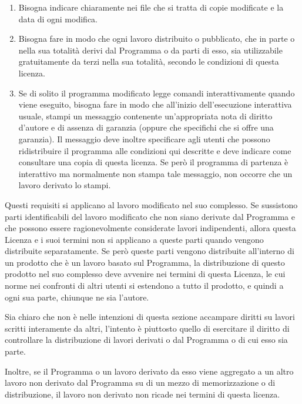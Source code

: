 \begin{enumerate}
  \begin{enumerate}
  \item Bisogna indicare chiaramente nei file che si tratta
    di copie modificate e la data di ogni modifica.

  \item Bisogna fare in modo che ogni lavoro distribuito o
    pubblicato, che in parte o nella sua totalit\`a derivi
    dal Programma o da parti di esso, sia utilizzabile
    gratuitamente da terzi nella sua totalit\`a, secondo le
    condizioni di questa licenza.

  \item Se di solito il programma modificato legge comandi
    interattivamente quando viene eseguito, bisogna fare in
    modo che all'inizio dell'esecuzione interattiva usuale,
    stampi un messaggio contenente un'appropriata nota di
    diritto d'autore e di assenza di garanzia (oppure che
    specifichi che si offre una garanzia). Il messaggio deve
    inoltre specificare agli utenti che possono
    ridistribuire il programma alle condizioni qui descritte
    e deve indicare come consultare una copia di questa
    licenza. Se per\`o il programma di partenza \`e
    interattivo ma normalmente non stampa tale messaggio,
    non occorre che un lavoro derivato lo stampi.
  \end{enumerate}

  Questi requisiti si applicano al lavoro modificato nel suo
  complesso. Se sussistono parti identificabili del lavoro
  modificato che non siano derivate dal Programma e che
  possono essere ragionevolmente considerate lavori
  indipendenti, allora questa Licenza e i suoi termini non
  si applicano a queste parti quando vengono distribuite
  separatamente. Se per\`o queste parti vengono distribuite
  all'interno di un prodotto che \`e un lavoro basato sul
  Programma, la distribuzione di questo prodotto nel suo
  complesso deve avvenire nei termini di questa Licenza, le
  cui norme nei confronti di altri utenti si estendono a
  tutto il prodotto, e quindi a ogni sua parte, chiunque ne
  sia l'autore.

  Sia chiaro che non \`e nelle intenzioni di questa sezione
  accampare diritti su lavori scritti interamente da altri,
  l'intento \`e piuttosto quello di esercitare il diritto di
  controllare la distribuzione di lavori derivati o dal
  Programma o di cui esso sia parte.

  Inoltre, se il Programma o un lavoro derivato da esso
  viene aggregato a un altro lavoro non derivato dal
  Programma su di un mezzo di memorizzazione o di
  distribuzione, il lavoro non derivato non ricade nei
  termini di questa licenza.


\end{enumerate}
